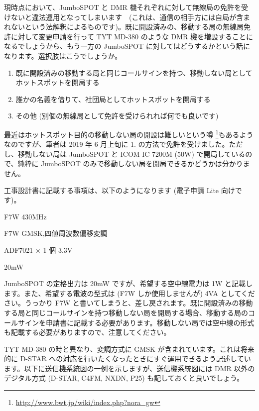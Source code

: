 \documentclass[a4j,oneside]{ujbook}
\begin{document}
現時点において、JumboSPOT と DMR 機それぞれに対して無線局の免許を受けないと違法運用となってしまいます　(これは、通信の相手方には自局が含まれないという法解釈によるものです)。既に開設済みの、移動する局の無線局免許に対して変更申請を行って TYT MD-380 のような DMR 機を増設することになるでしょうから、もう一方の JumboSPOT に対してはどうするかという話になります。選択肢はこうでしょうか。
\begin{enumerate}
 \item 既に開設済みの移動する局と同じコールサインを持つ、移動しない局としてホットスポットを開局する
 \item 誰かの名義を借りて、社団局としてホットスポットを開局する
 \item その他 (別個の無線局として免許を受けられれば何でも良いです)
\end{enumerate}
最近はホットスポット目的の移動しない局の開設は難しいという噂 \footnote{\url{http://www.bwt.jp/wiki/index.php?nora_gw}}もあるようなのですが、筆者は 2019 年 6 月上旬に 1. の方法で免許を受けました。ただし、移動しない局は JumboSPOT と ICOM IC-7200M (50W) で開局しているので、純粋に JumboSPOT のみで移動しない局を開局できるかどうかは分かりません。

工事設計書に記載する事項は、以下のようになります (電子申請 Lite 向けです)。
\begin{description}[style=nextline]
 \item[発射可能な電波の形式及び周波数の範囲] F7W 430MHz 
 \item[変調方式] F7W GMSK,四値周波数偏移変調 
 \item[終段管 (名称×個数・電圧)] ADF7021 × 1 個 3.3V 
 \item[定格出力] 20mW
\end{description}   
JumboSPOT の定格出力は 20mW ですが、希望する空中線電力は 1W と記載します。また、希望する電波の型式は (F7W しか使用しませんが) 4VA としてください。うっかり F7W と書いてしまうと、差し戻されます。既に開設済みの移動する局と同じコールサインを持つ移動しない局を開局する場合、移動する局のコールサインを申請書に記載する必要があります。移動しない局では空中線の形式も記載する必要がありますので、注意してください。

TYT MD-380 の時と異なり、変調方式に GMSK が含まれています。これは将来的に D-STAR への対応を行いたくなったときにすぐ運用できるよう記述しています。以下に送信機系統図の一例を示しますが、送信機系統図には DMR 以外のデジタル方式 (D-STAR, C4FM, NXDN, P25) も記しておくと良いでしょう。
\end{document}
